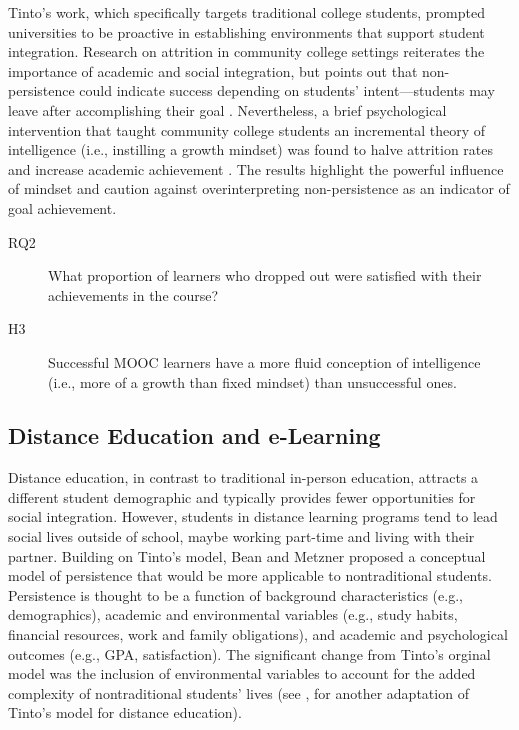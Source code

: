 \documentclass{sigchi}\usepackage[]{graphicx}\usepackage[]{color}
\begin{document}
Tinto's work, which specifically targets traditional college students, prompted universities to be proactive in establishing environments that support student integration. Research on attrition in community college settings reiterates the importance of academic and social integration, but points out that non-persistence could indicate success depending on students' intent---students may leave after accomplishing their goal \cite{bers1991persistence}. Nevertheless, a brief psychological intervention that taught community college students an incremental theory of intelligence (i.e., instilling a growth mindset) was found to halve attrition rates and increase academic achievement \cite{paunesku2012brief}. The results highlight the powerful influence of mindset and caution against overinterpreting non-persistence as an indicator of goal achievement.

\begin{description}
  \item[RQ2] What proportion of learners who dropped out were satisfied with their achievements in the course?
  \item[H3] Successful MOOC learners have a more fluid conception of intelligence (i.e., more of a growth than fixed mindset) than unsuccessful ones.
\end{description}

\subsection{Distance Education and e-Learning}

Distance education, in contrast to traditional in-person education, attracts a different student demographic and typically provides fewer opportunities for social integration. However, students in distance learning programs tend to lead social lives outside of school, maybe working part-time and living with their partner. Building on Tinto's model, Bean and Metzner \citeyear{bean1985conceptual} proposed a conceptual model of persistence that would be more applicable to nontraditional students. Persistence is thought to be a function of background characteristics (e.g., demographics), academic and environmental variables (e.g., study habits, financial resources, work and family obligations), and academic and psychological outcomes (e.g., GPA, satisfaction). The significant change from Tinto's orginal model was the inclusion of environmental variables to account for the added complexity of nontraditional students' lives (see \cite{kember1989longitudinal}, for another adaptation of Tinto's model for distance education).
\end{document}
